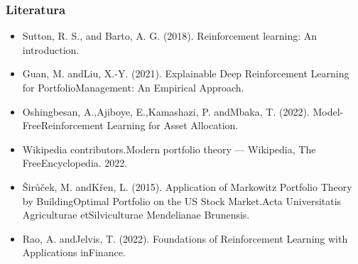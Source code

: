 \begin{frame}
    \frametitle{Literatura}
    {
        \fontsize{7}{15}\selectfont

        \begin{itemize}
            \item Sutton, R. S., and Barto, A. G. (2018). Reinforcement learning: An introduction.
            \item Guan, M. andLiu, X.-Y. (2021). Explainable Deep Reinforcement Learning for PortfolioManagement: An Empirical Approach.
            \item Oshingbesan, A.,Ajiboye, E.,Kamashazi, P. andMbaka, T. (2022). Model-FreeReinforcement Learning for Asset Allocation.
            \item Wikipedia contributors.Modern portfolio theory — Wikipedia, The FreeEncyclopedia. 2022.
            \item Širůček, M. andKřen, L. (2015). Application of Markowitz Portfolio Theory by BuildingOptimal Portfolio on the US Stock Market.Acta Universitatis Agriculturae etSilviculturae Mendelianae Brunensis.
            \item Rao, A. andJelvis, T. (2022). Foundations of Reinforcement Learning with Applications inFinance.
        \end{itemize}
    }
\end{frame}






